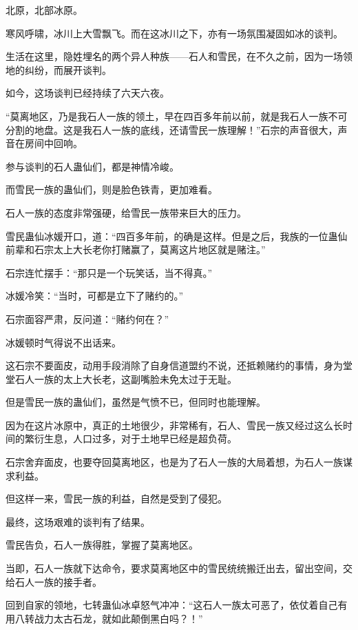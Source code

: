 
\begin{this_body}

北原，北部冰原。

寒风呼啸，冰川上大雪飘飞。而在这冰川之下，亦有一场氛围凝固如冰的谈判。

生活在这里，隐姓埋名的两个异人种族——石人和雪民，在不久之前，因为一场领地的纠纷，而展开谈判。

如今，这场谈判已经持续了六天六夜。

“莫离地区，乃是我石人一族的领土，早在四百多年前以前，就是我石人一族不可分割的地盘。这是我石人一族的底线，还请雪民一族理解！”石宗的声音很大，声音在房间中回响。

参与谈判的石人蛊仙们，都是神情冷峻。

而雪民一族的蛊仙们，则是脸色铁青，更加难看。

石人一族的态度非常强硬，给雪民一族带来巨大的压力。

雪民蛊仙冰媛开口，道：“四百多年前，的确是这样。但是之后，我族的一位蛊仙前辈和石宗太上大长老你打赌赢了，莫离这片地区就是赌注。”

石宗连忙摆手：“那只是一个玩笑话，当不得真。”

冰媛冷笑：“当时，可都是立下了赌约的。”

石宗面容严肃，反问道：“赌约何在？”

冰媛顿时气得说不出话来。

这石宗不要面皮，动用手段消除了自身信道盟约不说，还抵赖赌约的事情，身为堂堂石人一族的太上大长老，这副嘴脸未免太过于无耻。

但是雪民一族的蛊仙们，虽然是气愤不已，但同时也能理解。

因为在这片冰原中，真正的土地很少，非常稀有，石人、雪民一族又经过这么长时间的繁衍生息，人口过多，对于土地早已经是超负荷。

石宗舍弃面皮，也要夺回莫离地区，也是为了石人一族的大局着想，为石人一族谋求利益。

但这样一来，雪民一族的利益，自然是受到了侵犯。

最终，这场艰难的谈判有了结果。

雪民告负，石人一族得胜，掌握了莫离地区。

当即，石人一族就下达命令，要求莫离地区中的雪民统统搬迁出去，留出空间，交给石人一族的接手者。

回到自家的领地，七转蛊仙冰卓怒气冲冲：“这石人一族太可恶了，依仗着自己有用八转战力太古石龙，就如此颠倒黑白吗？！”


\end{this_body}
